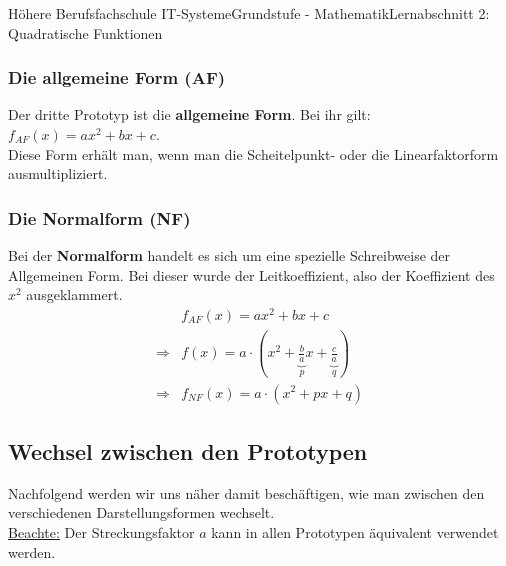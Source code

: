 \documentclass[11pt,twocolumn,oneside,openany,headings=optiontotoc,11pt,numbers=noenddot]{article}
\begin{document}
\begin{worksheet}{Höhere Berufsfachschule IT-Systeme}{Grundstufe - Mathematik}{Lernabschnitt 2: Quadratische Funktionen}
		\subsubsection*{Die allgemeine Form (AF)}
		Der dritte Prototyp ist die \textbf{allgemeine Form}. Bei ihr gilt: \(f_{AF}(x) = ax^2 +bx+c\).\\
		Diese Form erhält man, wenn man die Scheitelpunkt- oder die Linearfaktorform ausmultipliziert.
		\subsubsection*{Die Normalform (NF)}
		Bei der \textbf{Normalform} handelt es sich um eine spezielle Schreibweise der Allgemeinen Form. Bei dieser wurde der Leitkoeffizient, also der Koeffizient des \(x^2\) ausgeklammert.
		\begin{align*}
			& f_{AF}(x) = ax^2 +bx + c\\
			\Rightarrow & f(x) = a\cdot(x^2 + \underbrace{\frac{b}{a}}_{p}x + \underbrace{\frac{c}{a}}_{q})\\
			\Rightarrow & f_{NF}(x) = a\cdot(x^2 + px + q)
		\end{align*}
		\subsection{Wechsel zwischen den Prototypen}
		Nachfolgend werden wir uns näher damit beschäftigen, wie man zwischen den verschiedenen Darstellungsformen wechselt.\\
		\underline{Beachte:} Der Streckungsfaktor \(a\) kann in allen Prototypen äquivalent verwendet werden.

\end{worksheet}
\end{document}
